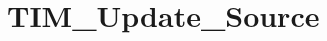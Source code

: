 \hypertarget{group___t_i_m___update___source}{\section{T\-I\-M\-\_\-\-Update\-\_\-\-Source}
\label{group___t_i_m___update___source}
}

